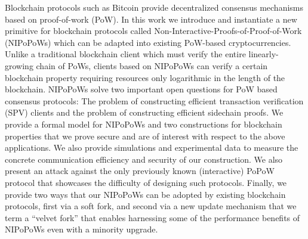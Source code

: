 Blockchain protocols such as Bitcoin provide decentralized consensus mechanisms
based on proof-of-work (PoW). In this work we introduce and instantiate a new
primitive for blockchain protocols called
Non-Interactive-Proofs-of-Proof-of-Work (NIPoPoWs) which can be adapted into
existing PoW-based cryptocurrencies. Unlike a traditional blockchain client
which must verify the entire linearly-growing chain of PoWs, clients based on
NIPoPoWs can verify a certain blockchain property requiring resources only
logarithmic in the length of the blockchain.
NIPoPoWs solve two important open questions for PoW based consensus protocols:
The problem of constructing efficient transaction verification (SPV) clients and
the problem of constructing efficient sidechain proofs. We provide a formal
model for NIPoPoWs and two constructions for blockchain properties that we prove
secure and are 
of interest with respect to  the above applications.  We also provide simulations and
experimental data to measure the concrete communication efficiency and security of our
construction. We
also present an attack against the only previously known (interactive) PoPoW
protocol that showcases the difficulty of designing such protocols. Finally, we
provide two ways that our NIPoPoWs can be adopted by existing blockchain
protocols, first via a soft fork, and second via a new update mechanism that we
term a ``velvet fork'' that enables harnessing some of the performance benefits
of NIPoPoWs even with a minority upgrade.
